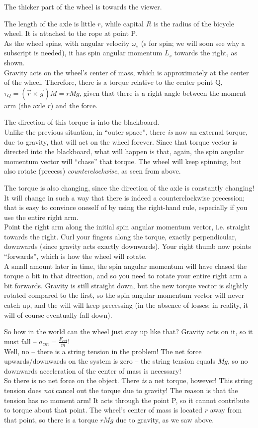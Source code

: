 The thicker part of the wheel is towards the viewer.

The length of the axle is little $r$, while capital $R$ is the radius of the bicycle wheel. It is attached to the rope at point P.\\
As the wheel spins, with angular velocity $\omega_s$ (s for spin; we will soon see why a subscript is needed), it has spin angular momentum $L_s$ towards the right, as shown.\\
Gravity acts on the wheel's center of mass, which is approximately at the center of the wheel. Therefore, there is a torque relative to the center point Q, $\tau_Q = (\vec{r} \times \vec{g}) M = r M g$, given that there is a right angle between the moment arm (the axle $r$) and the force.

The direction of this torque is into the blackboard.\\
Unlike the previous situation, in ``outer space'', there \emph{is} now an external torque, due to gravity, that will act on the wheel forever. Since that torque vector is directed into the blackboard, what will happen is that, again, the spin angular momentum vector will ``chase'' that torque. The wheel will keep spinning, but also rotate (precess) \emph{counterclockwise}, as seen from above.

The torque is also changing, since the direction of the axle is constantly changing! It will change in such a way that there is indeed a counterclockwise precession; that is easy to convince oneself of by using the right-hand rule, especially if you use the entire right arm.\\
Point the right arm along the initial spin angular momentum vector, i.e. straight towards the right. Curl your fingers along the torque, exactly perpendicular, downwards (since gravity acts exactly downwards). Your right thumb now points ``forwards'', which is how the wheel will rotate.\\
A small amount later in time, the spin angular momentum will have chased the torque a bit in that direction, and so you need to rotate your entire right arm a bit forwards. Gravity is still straight down, but the new torque vector is slightly rotated compared to the first, so the spin angular momentum vector will never catch up, and the will will keep precessing (in the absence of losses; in reality, it will of course eventually fall down).

So how in the world can the wheel just stay up like that? Gravity acts on it, so it must fall -- $\displaystyle a_{cm} = \frac{F_{ext}}{m}$!\\
Well, no -- there is a string tension in the problem! The net force upwards/downwards on the system is zero -- the string tension equals $M g$, so no downwards acceleration of the center of mass is necessary!\\
So there is no net force on the object. There \emph{is} a net torque, however! This string tension does \emph{not} cancel out the torque due to gravity! The reason is that the tension has no moment arm! It acts through the point P, so it cannot contribute to torque about that point. The wheel's center of mass is located $r$ away from that point, so there is a torque $r M g$ due to gravity, as we saw above.

